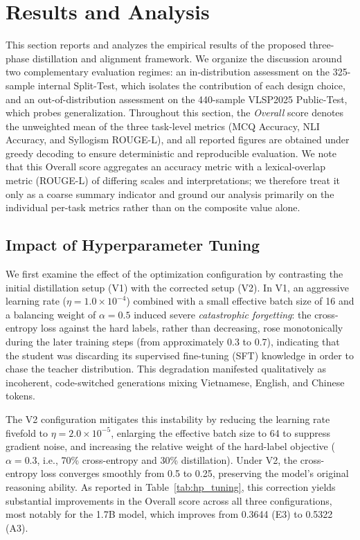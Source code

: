 \section{Results and Analysis}

This section reports and analyzes the empirical results of the proposed three-phase distillation and alignment framework. We organize the discussion around two complementary evaluation regimes: an in-distribution assessment on the 325-sample internal Split-Test, which isolates the contribution of each design choice, and an out-of-distribution assessment on the 440-sample VLSP2025 Public-Test, which probes generalization. Throughout this section, the \textit{Overall} score denotes the unweighted mean of the three task-level metrics (MCQ Accuracy, NLI Accuracy, and Syllogism ROUGE-L), and all reported figures are obtained under greedy decoding to ensure deterministic and reproducible evaluation. We note that this Overall score aggregates an accuracy metric with a lexical-overlap metric (ROUGE-L) of differing scales and interpretations; we therefore treat it only as a coarse summary indicator and ground our analysis primarily on the individual per-task metrics rather than on the composite value alone.

\subsection{Impact of Hyperparameter Tuning}

We first examine the effect of the optimization configuration by contrasting the initial distillation setup (V1) with the corrected setup (V2). In V1, an aggressive learning rate ($\eta = 1.0 \times 10^{-4}$) combined with a small effective batch size of 16 and a balancing weight of $\alpha = 0.5$ induced severe \textit{catastrophic forgetting}: the cross-entropy loss against the hard labels, rather than decreasing, rose monotonically during the later training steps (from approximately 0.3 to 0.7), indicating that the student was discarding its supervised fine-tuning (SFT) knowledge in order to chase the teacher distribution. This degradation manifested qualitatively as incoherent, code-switched generations mixing Vietnamese, English, and Chinese tokens.

The V2 configuration mitigates this instability by reducing the learning rate fivefold to $\eta = 2.0 \times 10^{-5}$, enlarging the effective batch size to 64 to suppress gradient noise, and increasing the relative weight of the hard-label objective ($\alpha = 0.3$, i.e., 70\% cross-entropy and 30\% distillation). Under V2, the cross-entropy loss converges smoothly from 0.5 to 0.25, preserving the model's original reasoning ability. As reported in Table~\ref{tab:hp_tuning}, this correction yields substantial improvements in the Overall score across all three configurations, most notably for the 1.7B model, which improves from 0.3644 (E3) to 0.5322 (A3).


